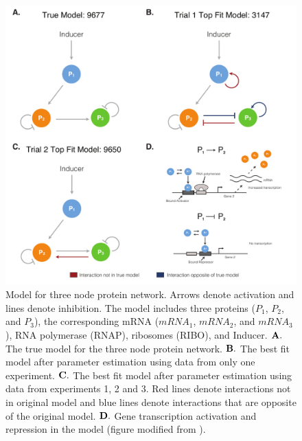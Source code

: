 \documentclass[12pt]{article}
\begin{document}
\clearpage



\clearpage

\begin{figure}\centering
\includegraphics[width=1.0\textwidth]{./figs_chp3/Fig1_3node_models.pdf}
\caption{Model for three node protein network. Arrows denote activation and lines denote inhibition. The model includes three proteins ($P_{1}$, $P_{2}$, and $P_{3}$), the corresponding mRNA ($mRNA_{1}$, $mRNA_{2}$, and $mRNA_{3}$), RNA polymerase (RNAP), ribosomes (RIBO), and Inducer. $\bf{A.}$ The true model for the three node protein network. $\bf{B.}$ The best fit model after parameter estimation using data from only one experiment. $\bf{C.}$ The best fit model after parameter estimation using data from experiments 1, 2 and 3. Red lines denote interactions not in original model and blue lines denote interactions that are opposite of the original model. $\bf{D.}$ Gene transcription activation and repression in the model (figure modified from \cite{Alon2007}).}
\label{fg:3node_models}
\end{figure}

\clearpage
\end{document}
